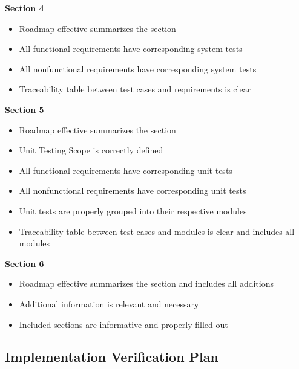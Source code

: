 \documentclass[12pt, titlepage]{article}
\begin{document}
\noindent
\textbf{Section 4}
\begin{itemize}
  \item Roadmap effective summarizes the section
  \item All functional requirements have corresponding system tests
  \item All nonfunctional requirements have corresponding system tests
  \item Traceability table between test cases and requirements is clear
\end{itemize}
\noindent
\textbf{Section 5}
\begin{itemize}
  \item Roadmap effective summarizes the section
  \item Unit Testing Scope is correctly defined
  \item All functional requirements have corresponding unit tests
  \item All nonfunctional requirements have corresponding unit tests
  \item Unit tests are properly grouped into their respective modules
  \item Traceability table between test cases and modules is clear and includes all modules
\end{itemize}
\noindent
\textbf{Section 6}
\begin{itemize}
  \item Roadmap effective summarizes the section and includes all additions
  \item Additional information is relevant and necessary
  \item Included sections are informative and properly filled out
\end{itemize}


\subsection{Implementation Verification Plan}



\end{document}
